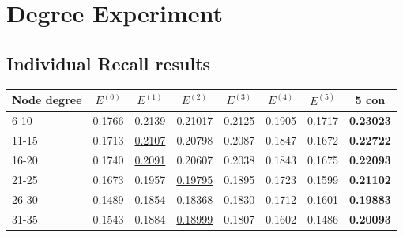 \section{Degree Experiment}\label{app:degree-experiment}

\subsection{Individual Recall results}\label{app:individual-recall-degree-experiment}
\begin{table}[h!]
    \centering
    \begin{tabular}{|l|l|l|l|l|l|l||l|}
        \hline
        Node degree & \multicolumn{1}{c|}{$E^{(0)}$} & \multicolumn{1}{c|}{$E^{(1)}$} & \multicolumn{1}{c|}{$E^{(2)}$} & \multicolumn{1}{c|}{$E^{(3)}$} & \multicolumn{1}{c|}{$E^{(4)}$} & \multicolumn{1}{c||}{$E^{(5)}$} & \multicolumn{1}{c|}{5 con} \\ \hline
        6-10        & 0.1766                         & \underline{0.2139}             & 0.21017                        & 0.2125                         & 0.1905                         & 0.1717                          & \textbf{0.23023}           \\ \hline
        11-15       & 0.1713                         & \underline{0.2107}             & 0.20798                        & 0.2087                         & 0.1847                         & 0.1672                          & \textbf{0.22722}           \\ \hline
        16-20       & 0.1740                         & \underline{0.2091}             & 0.20607                        & 0.2038                         & 0.1843                         & 0.1675                          & \textbf{0.22093}           \\ \hline
        21-25       & 0.1673                         & 0.1957                         & \underline{0.19795}            & 0.1895                         & 0.1723                         & 0.1599                          & \textbf{0.21102}           \\ \hline
        26-30       & 0.1489                         & \underline{0.1854}             & 0.18368                        & 0.1830                         & 0.1712                         & 0.1601                          & \textbf{0.19883}           \\ \hline
        31-35       & 0.1543                         & 0.1884                         & \underline{0.18999}            & 0.1807                         & 0.1602                         & 0.1486                          & \textbf{0.20093}           \\ \hline

\end{tabular}
\end{table}
